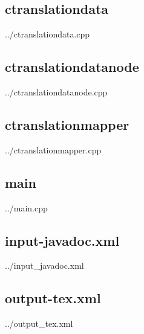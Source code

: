 \documentclass[	a4paper,		%
		titlepage, 		%
		fontsize=12pt		%
		]{scrartcl} 		%
\begin{document}
\subsection{ctranslationdata}

	{../ctranslationdata.cpp}

\subsection{ctranslationdatanode}

	{../ctranslationdatanode.cpp}

\subsection{ctranslationmapper}

	{../ctranslationmapper.cpp}

\subsection{main}

	{../main.cpp}

\subsection{input-javadoc.xml}

	{../input_javadoc.xml}

\subsection{output-tex.xml}

	{../output_tex.xml}
\end{document}
